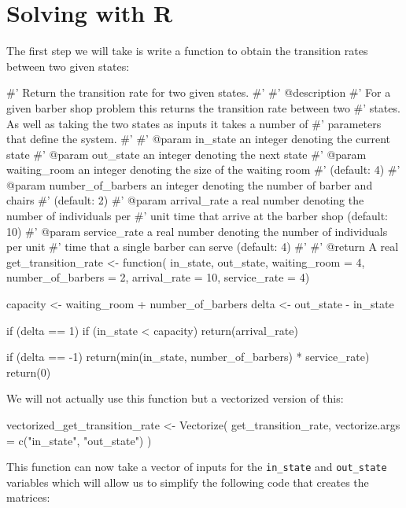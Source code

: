 \section{Solving with R}\label{sec:solving-with-R}

The first step we will take is write a function to obtain the transition rates
between two given states:

\begin{Rin}
#' Return the transition rate for two given states.
#'
#' @description
#' For a given barber shop problem this returns the transition rate between two
#' states. As well as taking the two states as inputs it takes a number of
#' parameters that define the system.
#'
#' @param in_state an integer denoting the current state
#' @param out_state an integer denoting the next state
#' @param waiting_room an integer denoting the size of the waiting room
#' (default: 4)
#' @param number_of_barbers an integer denoting the number of barber and chairs
#' (default: 2)
#' @param arrival_rate a real number denoting the number of individuals per
#' unit time that arrive at the barber shop (default: 10)
#' @param service_rate a real number denoting the number of individuals per unit
#' time that a single barber can serve (default: 4)
#'
#' @return A real
get_transition_rate <- function(
                                in_state,
                                out_state,
                                waiting_room = 4,
                                number_of_barbers = 2,
                                arrival_rate = 10,
                                service_rate = 4) {
  capacity <- waiting_room + number_of_barbers
  delta <- out_state - in_state

  if (delta == 1) {
    if (in_state < capacity) {
      return(arrival_rate)
    }
  }

  if (delta == -1) {
    return(min(in_state, number_of_barbers) * service_rate)
  }
  return(0)
}
\end{Rin}

We will not actually use this function but a vectorized version of this:

\begin{Rin}
vectorized_get_transition_rate <- Vectorize(
  get_transition_rate,
  vectorize.args = c("in_state", "out_state")
)
\end{Rin}

This function can now take a vector of inputs for the \texttt{in_state}
and \texttt{out_state} variables which will allow us to simplify the
following code that creates the matrices:

